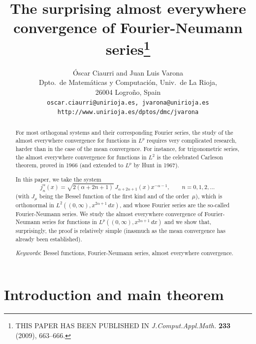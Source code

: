 \documentclass[10pt,a4paper]{article}
\title{The surprising almost everywhere convergence 
of Fourier-Neumann series\thanks{THIS PAPER HAS BEEN PUBLISHED IN 
\textit{J.\@ Comput.\@ Appl.\@ Math.\@} \textbf{233} (2009), 663--666.}}
\author{\'Oscar Ciaurri and Juan Luis Varona\\
{\small Dpto.\ de Matem\'aticas y Computaci\'on, Univ.\ de La Rioja,}\\[-2pt]
{\small 26004 Logro\~no, Spain}\\
{\small \texttt{oscar.ciaurri@unirioja.es, jvarona@unirioja.es}}\\[-2pt]
{\small \texttt{http://www.unirioja.es/dptos/dmc/jvarona}}}
\date{}
\theoremstyle{plain}
\begin{document}

\maketitle

\begin{abstract}
For most orthogonal systems and their corresponding Fourier series, the study of the almost everywhere convergence for functions in $L^p$ requires very complicated research, harder than in the case of the mean convergence. For instance, for trigonometric series, the almost everywhere convergence for functions in $L^2$ is the celebrated Carleson theorem, proved in 1966 (and extended to $L^p$ by Hunt in 1967). 

In this paper, we take the system 
\begin{equation*}
  j_n^{\alpha}(x) = \sqrt{2(\alpha+2n+1)}\,J_{\alpha+2n+1}(x) x^{-\alpha-1},
  \qquad n = 0,1,2,\dots\,
\end{equation*}
(with $J_\mu$ being the Bessel function of the first kind and of the order~$\mu$),
which is orthonormal in $L^2((0,\infty),x^{2\alpha+1}\,dx)$, and whose Fourier series are the so-called Fourier-Neumann series. We study the almost everywhere convergence of Fourier-Neumann series for functions in $L^p((0,\infty),x^{2\alpha+1}\,dx)$ and we show that, surprisingly, the proof is relatively simple (inasmuch as the mean convergence has already been established).

\medskip

\textit{Keywords}: Bessel functions,
Fourier-Neumann series, almost everywhere convergence.
\end{abstract}

\section{Introduction and main theorem}
\end{document}
